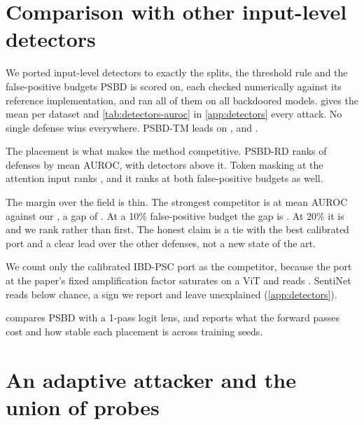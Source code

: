 \section{Comparison with other input-level detectors}
\label{sec:robustness:detectors}\label{sec:detectors}

We ported \DetectorsComparedCount{} input-level detectors to exactly the splits, the threshold rule and the false-positive budgets PSBD is scored on, each checked numerically against its reference implementation, and ran all of them on all \DetectorsComparedModels{} backdoored models.  gives the mean per dataset and \cref{tab:detectors-auroc} in \cref{app:detectors} every attack. No single defense wins everywhere. PSBD-TM leads on \DetectorsAurocDatasetsOursLeads{}, and \DetectorsAurocDatasetsOthersLead{}.



The placement is what makes the method competitive. PSBD-RD ranks \DetectorsAurocRankPublished{} of \DetectorsAurocDefensesRanked{} defenses by mean AUROC, with \DetectorsAurocBeatingPublished{} detectors above it. Token masking at the attention input ranks \DetectorsAurocRankOurs{}, and it ranks \DetectorsTprOneZeroRankOurs{} at both false-positive budgets as well.

The margin over the field is thin. The strongest competitor is \DetectorsAurocBestCompetitorName{} at \DetectorsAurocBestCompetitor{} mean AUROC against our \DetectorsAurocOurs{}, a gap of \DetectorsAurocMargin{}. At a 10\% false-positive budget the gap is \DetectorsTprOneZeroMargin{}. At 20\% it is \DetectorsTprTwoZeroMargin{} and we rank \DetectorsTprTwoZeroRankOurs{} rather than first. The honest claim is a tie with the best calibrated port and a clear lead over the other defenses, not a new state of the art.

We count only the calibrated IBD-PSC port as the competitor, because the port at the paper's fixed amplification factor saturates on a ViT and reads \DetectorsAurocIbdPsc{}. SentiNet reads below chance, a sign we report and leave unexplained (\cref{app:detectors}).

 compares PSBD with a 1-pass logit lens, and reports what the forward passes cost and how stable each placement is across training seeds.

\section{An adaptive attacker and the union of probes}
\label{sec:robustness:adaptive}

